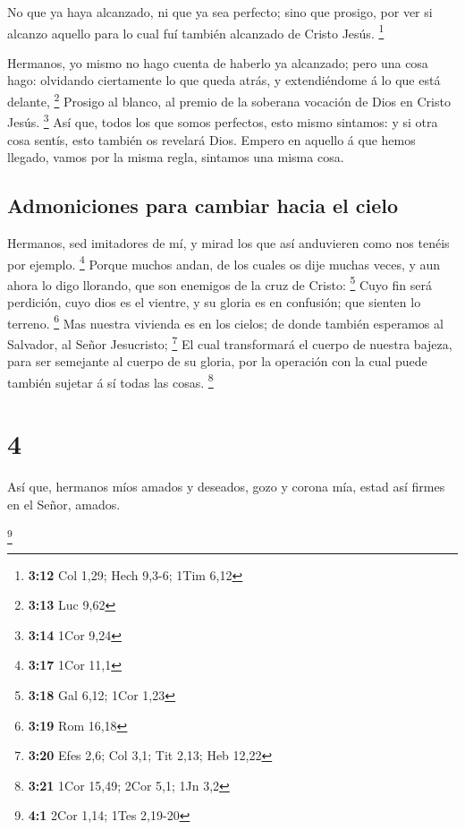  No que ya haya alcanzado, ni que ya sea perfecto; sino
que prosigo, por ver si alcanzo aquello para lo cual fuí también
alcanzado de Cristo Jesús. \footnote{\textbf{3:12} Col 1,29; Hech 9,3-6;
  1Tim 6,12}

 Hermanos, yo mismo no hago cuenta de haberlo ya
alcanzado; pero una cosa hago: olvidando ciertamente lo que queda atrás,
y extendiéndome á lo que está delante, \footnote{\textbf{3:13} Luc 9,62}
 Prosigo al blanco, al premio de la soberana vocación de
Dios en Cristo Jesús. \footnote{\textbf{3:14} 1Cor 9,24} 
Así que, todos los que somos perfectos, esto mismo sintamos: y si otra
cosa sentís, esto también os revelará Dios.  Empero en
aquello á que hemos llegado, vamos por la misma regla, sintamos una
misma cosa.

\hypertarget{admoniciones-para-cambiar-hacia-el-cielo}{%
\subsection{Admoniciones para cambiar hacia el
cielo}\label{admoniciones-para-cambiar-hacia-el-cielo}}

 Hermanos, sed imitadores de mí, y mirad los que así
anduvieren como nos tenéis por ejemplo. \footnote{\textbf{3:17} 1Cor
  11,1}  Porque muchos andan, de los cuales os dije
muchas veces, y aun ahora lo digo llorando, que son enemigos de la cruz
de Cristo: \footnote{\textbf{3:18} Gal 6,12; 1Cor 1,23} 
Cuyo fin será perdición, cuyo dios es el vientre, y su gloria es en
confusión; que sienten lo terreno. \footnote{\textbf{3:19} Rom 16,18}
 Mas nuestra vivienda es en los cielos; de donde también
esperamos al Salvador, al Señor Jesucristo; \footnote{\textbf{3:20} Efes
  2,6; Col 3,1; Tit 2,13; Heb 12,22}  El cual
transformará el cuerpo de nuestra bajeza, para ser semejante al cuerpo
de su gloria, por la operación con la cual puede también sujetar á sí
todas las cosas. \footnote{\textbf{3:21} 1Cor 15,49; 2Cor 5,1; 1Jn 3,2}

\hypertarget{section-3}{%
\section{4}\label{section-3}}

 Así que, hermanos míos amados y deseados, gozo y corona
mía, estad así firmes en el Señor, amados.

\footnote{\textbf{4:1} 2Cor 1,14; 1Tes 2,19-20}

